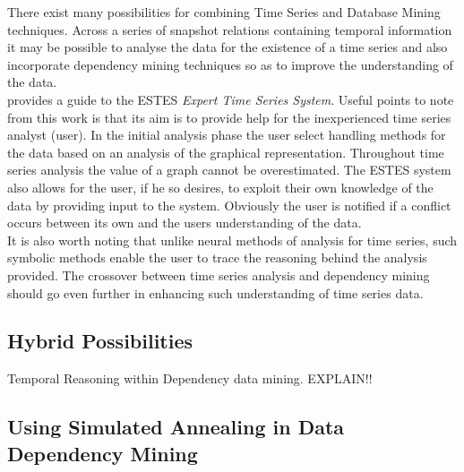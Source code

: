 There exist many possibilities for combining Time Series and
Database Mining techniques.  Across a series of snapshot
relations containing temporal information it may be
possible to analyse the data for the existence of a time series
and also incorporate dependency mining techniques so as to
improve the understanding of the data.\\

\cite{hie90} provides a guide to the ESTES {\em Expert Time
Series System}.  Useful points to note from this work is that
its aim is to provide help for the inexperienced time series
analyst (user).  In the initial analysis phase the user select handling
methods for the data based on an analysis of the graphical
representation.  Throughout time series analysis the value of
a graph cannot be overestimated.  The ESTES system also allows for
the user, if he so desires, to exploit their own knowledge of the 
data by providing input to the system.  Obviously the user is
notified if a conflict occurs between its own and the users
understanding of the data.  \\

It is also worth noting that unlike neural methods of analysis for
time series, such symbolic methods enable the user to trace the
reasoning behind the analysis provided.  The crossover between
time series analysis and dependency mining  should go even
further in enhancing such understanding of time series data.\\

\subsection{Hybrid Possibilities}

Temporal Reasoning within Dependency data mining.  EXPLAIN!!


\subsection{Using Simulated Annealing in Data Dependency Mining}

